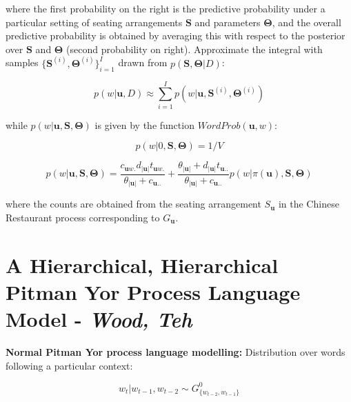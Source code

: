 \noindent where the first probability on the right is the predictive probability under a particular setting of seating arrangements $\boldsymbol{S}$ and parameters $\boldsymbol\Theta$, and the overall predictive probability is obtained by averaging this with respect to the posterior over $\boldsymbol{S}$ and $\boldsymbol\Theta$ (second probability on right). Approximate the integral with samples $\{\boldsymbol S^{(i)}, \boldsymbol\Theta^{(i)}\}_{i=1}^{I}$ drawn from $p(\boldsymbol S, \boldsymbol\Theta |D)$:

\begin{equation}
p(w|\boldsymbol u, D)\approx \sum_{i=1}^{I}p(w|\boldsymbol u, \boldsymbol S^{(i)}, \boldsymbol \Theta ^{(i)})
\label{eq:mcmcIntegralApprox}
\end{equation}

\noindent while $p(w|\boldsymbol u, \boldsymbol S, \boldsymbol \Theta)$ is given by the function $WordProb(\boldsymbol u, w)$:

\begin{equation}
p(w|0, \boldsymbol S, \boldsymbol \Theta)=1/V
\label{eq:mcmcWordProb1}
\end{equation}

\begin{equation}
p(w|\boldsymbol u, \boldsymbol S, \boldsymbol \Theta)=\frac{c_{\boldsymbol u w.}d_{|\boldsymbol u |}t_{\boldsymbol u w.}}{\theta_{|\boldsymbol u |}+c_{\boldsymbol u ..}} + \frac{\theta_{|\boldsymbol u |}+d_{|\boldsymbol u |}t_{\boldsymbol u ..}}{\theta_{|\boldsymbol u |}+c_{\boldsymbol u ..}}p(w|\pi(\boldsymbol u), \boldsymbol S, \boldsymbol \Theta)
\label{eq:mcmcWordProb2}
\end{equation}

\noindent where the counts are obtained from the seating arrangement $S_{\boldsymbol u}$ in the Chinese Restaurant process corresponding to $G_{\boldsymbol u}$.

\section{A Hierarchical, Hierarchical Pitman Yor Process Language Model - \textit{Wood, Teh}} \cite{wood2008hierarchical}

\textbf{Normal Pitman Yor process language modelling:} Distribution over words following a particular context:

\begin{equation}
w_{t}|w_{t-1}, w_{t-2} \sim G_{\{w_{t-2},w_{t-1}\}}^{0}
\label{eq:PYWordDistribution}
\end{equation}

